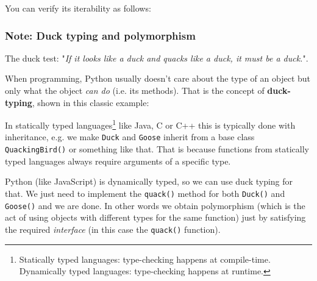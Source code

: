 
\hrulefill

You can verify its iterability as follows:



\hrulefill

\subsubsection{Note: Duck typing and polymorphism}
The duck test: "\textit{If it looks like a duck and quacks like a duck, it must be a duck.}".

When programming, Python usually doesn't care about the type of an object but only what the object \textit{can do} (i.e. its methods). That is the concept of \textbf{duck-typing}, shown in this classic example:



In statically typed languages\footnote{Statically typed languages: type-checking happens at compile-time. Dynamically typed languages: type-checking happens at runtime.} like Java, C or C++ this is typically done with inheritance, e.g. we make \texttt{Duck} and \texttt{Goose} inherit from a base class \texttt{QuackingBird()} or something like that. That is because functions from statically typed languages always require arguments of a specific type.

Python (like JavaScript) is dynamically typed, so we can use duck typing for that. We just need to implement the \texttt{quack()} method for both \texttt{Duck()} and \texttt{Goose()} and we are done. In other words we obtain polymorphism (which is the act of using objects with different types for the same function) just by satisfying the required \textit{interface} (in this case the \texttt{quack()} function).

\hrulefill

